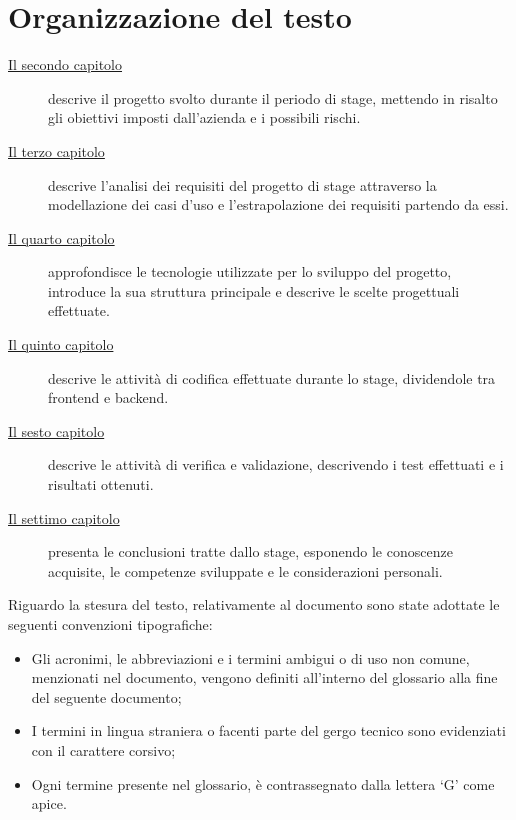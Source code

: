 \section{Organizzazione del testo}\label{sec:organizzazione-testo}
\begin{description}
    \item[{\hyperref[cap:descrizione-stage]{Il secondo capitolo}}] descrive il progetto svolto durante il periodo di stage, mettendo in risalto gli obiettivi imposti dall'azienda e i possibili rischi.
    \item[{\hyperref[cap:analisi-requisiti]{Il terzo capitolo}}] descrive l'analisi dei requisiti del progetto di stage attraverso la modellazione dei casi d'uso e l'estrapolazione dei requisiti partendo da essi.
    \item[{\hyperref[cap:struttura-progettazione]{Il quarto capitolo}}] approfondisce le tecnologie utilizzate per lo sviluppo del progetto, introduce la sua struttura principale e descrive le scelte progettuali effettuate.
    \item[{\hyperref[cap:codifica]{Il quinto capitolo}}] descrive le attività di codifica effettuate durante lo stage, dividendole tra frontend e backend.
    \item[{\hyperref[cap:verifica-validazione]{Il sesto capitolo}}] descrive le attività di verifica e validazione, descrivendo i test effettuati e i risultati ottenuti.
    \item[{\hyperref[cap:conclusioni]{Il settimo capitolo}}] presenta le conclusioni tratte dallo stage, esponendo le conoscenze acquisite, le competenze sviluppate e le considerazioni personali. 
\end{description}

\clearpage

Riguardo la stesura del testo, relativamente al documento sono state adottate le seguenti convenzioni tipografiche:
\begin{itemize}
  \item Gli acronimi, le abbreviazioni e i termini ambigui o di uso non comune, menzionati nel documento, vengono definiti all'interno del glossario alla fine del seguente documento;
  \item I termini in lingua straniera o facenti parte del gergo tecnico sono evidenziati con il carattere corsivo;
  \item Ogni termine presente nel glossario, è contrassegnato dalla lettera `G' come apice.
\end{itemize}
